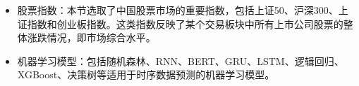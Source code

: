 \begin{itemize}[topsep = 0 pt, itemsep= 0 pt, parsep=0pt, partopsep=0pt, leftmargin=36pt, itemindent=0pt, labelsep=6pt, listparindent=24pt]
	\item 股票指数：本节选取了中国股票市场的重要指数，包括上证50、沪深300、上证指数和创业板指数。这类指数反映了某个交易板块中所有上市公司股票的整体涨跌情况，即市场综合水平。
	\item 机器学习模型：包括随机森林\cite{DBLP:journals/pami/Ho98}、RNN\cite{rumelhart1986learning}、BERT\cite{DBLP:conf/naacl/DevlinCLT19}、GRU\cite{DBLP:conf/emnlp/ChoMGBBSB14}、LSTM\cite{DBLP:journals/neco/HochreiterS97}、逻辑回归\cite{cox1958regression}、XGBoost\cite{DBLP:conf/kdd/ChenG16}、决策树\cite{DBLP:books/mk/Quinlan93}等适用于时序数据预测的机器学习模型。
\end{itemize}

